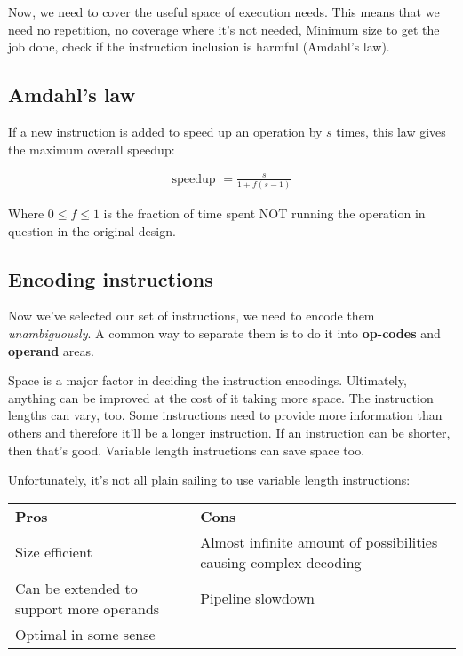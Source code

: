 \documentclass[11pt,a4paper,titlepage,dvipsnames,cmyk]{scrartcl}
\begin{document}
Now, we need to cover the useful space of execution needs. This means that
we need no repetition, no coverage where it's not needed, Minimum size
to get the job done, check if the instruction inclusion is harmful
(Amdahl's law).

\subsection{Amdahl's law}%
\label{sub:Amdahl's law}
If a new instruction is added to speed up an operation by $s$ times, this
law gives the maximum overall speedup:

\begin{align*}
    \text{speedup } = \frac{s}{1+f(s-1)}
\end{align*}

Where $0 \le f \le 1$ is the fraction of time spent NOT running the
operation in question in the original design.

\subsection{Encoding instructions}%
\label{sub:encoding}
Now we've selected our set of instructions, we need to encode them
\textit{unambiguously}. A common way to separate them is to do it into
\textbf{op-codes} and \textbf{operand} areas. 

Space is a major factor in deciding the instruction encodings. Ultimately,
anything can be improved at the cost of it taking more space. The
instruction lengths can vary, too. Some instructions need to provide more
information than others and therefore it'll be a longer instruction. If an
instruction can be shorter, then that's good. Variable length instructions
can save space too.

Unfortunately, it's not all plain sailing to use variable length
instructions:

\begin{center}
    \begin{tabular}{l|p{65mm}}
        \textbf{Pros} & \textbf{Cons} \\ \hhline{=|=}
        Size efficient & Almost infinite amount of possibilities causing
        complex decoding \\ \hline
        Can be extended to support more operands & Pipeline slowdown \\
        \hline
        Optimal in some sense & 
    \end{tabular}
\end{center}
\end{document}
